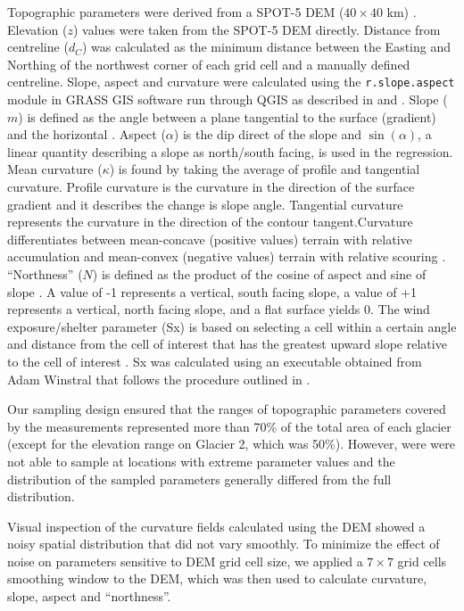 \documentclass[twocolumn,letterpaper]{igs}
\begin{document}
Topographic parameters were derived from a SPOT-5 DEM ($40\times40$ km) \citep{Korona2009}. Elevation ($z$) values were taken from the SPOT-5 DEM directly. Distance from centreline ($d_C$) was calculated as the minimum distance between the Easting and Northing of the northwest corner of each grid cell and a manually defined centreline. Slope, aspect and curvature were calculated using the \texttt{r.slope.aspect} module in GRASS GIS software run through QGIS as described in \cite{Mitavsova1993} and \cite{Hofierka2009}. Slope ($m$) is defined as the angle between a plane tangential to the surface (gradient) and the horizontal \citep{Olaya2009}. Aspect ($\alpha$) is the dip direct of the slope and $\sin(\alpha)$, a linear quantity describing a slope as north/south facing, is used in the regression. Mean curvature ($\kappa$) is found by taking the average of profile and tangential curvature. Profile curvature is the curvature in the direction of the surface gradient and it describes the change is slope angle. Tangential curvature represents the curvature in the direction of the contour tangent.Curvature differentiates between mean-concave (positive values) terrain with relative accumulation and mean-convex (negative values) terrain with relative scouring \citep{Olaya2009}. ``Northness'' ($N$) is defined as the product of the cosine of aspect and sine of slope \citep{Molotch2005}. A value of -1 represents a vertical, south facing slope, a value of +1 represents a vertical, north facing slope, and a flat surface yields 0. The wind exposure/shelter parameter (Sx) is based on selecting a cell within a certain angle and distance from the cell of interest that has the greatest upward slope relative to the cell of interest \citep{Winstral2002}. Sx was calculated using an executable obtained from Adam Winstral that follows the procedure outlined in \cite{Winstral2002}. 

Our sampling design ensured that the ranges of topographic parameters covered by the measurements represented more than 70\% of the total area of each glacier (except for the elevation range on Glacier 2, which was 50\%). However, were were not able to sample at locations with extreme parameter values and the distribution of the sampled parameters generally differed from the full distribution.

Visual inspection of the curvature fields calculated using the DEM showed a noisy spatial
distribution that did not vary smoothly. To minimize the effect of noise on parameters sensitive to DEM grid cell size, we applied a $7\times7$ grid cells smoothing window to the DEM, which was then used to calculate curvature, slope, aspect and ``northness''.
\end{document}
